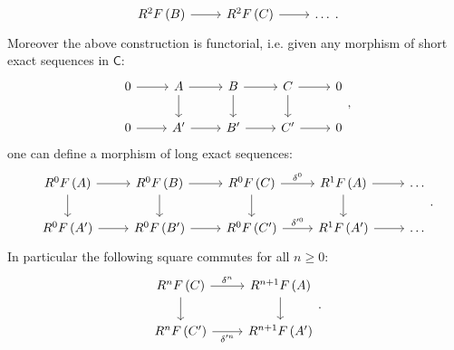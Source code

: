\documentclass[../Main]{subfiles}
\begin{document}
\begin{prop}[]
\begin{enumerate}
\begin{equation}
\begin{tikzcd}[row sep=tiny]
				R^{2}F \left( B \right) \arrow[r, "", rightarrow] &
				R^{2}F \left( C \right) \arrow[r, "", rightarrow] &
				\ldots
			\end{tikzcd}
			.\end{equation}
			Moreover the above construction is functorial, i.e. given
			any morphism of short exact sequences in $\mathsf{C}$:
			\begin{equation}
			\begin{tikzcd}
				0 \arrow[r, "", rightarrow] &
				A \arrow[r, "", rightarrow] \arrow[d, "", rightarrow] &
				B \arrow[r, "", rightarrow] \arrow[d, "", rightarrow] &
				C \arrow[r, "", rightarrow] \arrow[d, "", rightarrow] &
				0\\
				0 \arrow[r, "", rightarrow] &
				A' \arrow[r, "", rightarrow] &
				B' \arrow[r, "", rightarrow] &
				C' \arrow[r, "", rightarrow] &
				0
			\end{tikzcd}
			,\end{equation} 
			one can define a morphism of long exact sequences:
			\begin{equation*}
			\begin{tikzcd}
				R^{0}F \left( A \right) \arrow[r, "", rightarrow] 
				\arrow[d, "", rightarrow] &
				R^{0}F \left( B \right) \arrow[r, "", rightarrow] 
				\arrow[d, "", rightarrow] &
				R^{0}F \left( C \right) \arrow[r, "\delta^0", rightarrow] 
				\arrow[d, "", rightarrow] &
				R^{1}F \left( A \right) \arrow[r, "", rightarrow] 
				\arrow[d, "", rightarrow] &
				\ldots \\
				R^{0}F \left( A' \right) \arrow[r, "", rightarrow] &
				R^{0}F \left( B' \right) \arrow[r, "", rightarrow] &
				R^{0}F \left( C' \right) \arrow[r, "\delta'^0", rightarrow] &
				R^{1}F \left( A' \right) \arrow[r, "", rightarrow] &
				\ldots
			\end{tikzcd}
			.\end{equation*} 
			In particular the following square commutes for all $n \geq 0$:
			\begin{equation}
			\begin{tikzcd}	
				R^{n}F \left( C \right) \arrow[r, "\delta^n", rightarrow] 
				\arrow[d, "", rightarrow] &
				R^{n+1}F \left( A \right) \arrow[d, "", rightarrow] \\
				R^{n}F \left( C' \right) \arrow[r, "\delta'^n"', rightarrow] &
				R^{n+1}F \left( A' \right)
			\end{tikzcd}
			.\end{equation} 
	\end{enumerate}
\end{prop}
\end{document}
